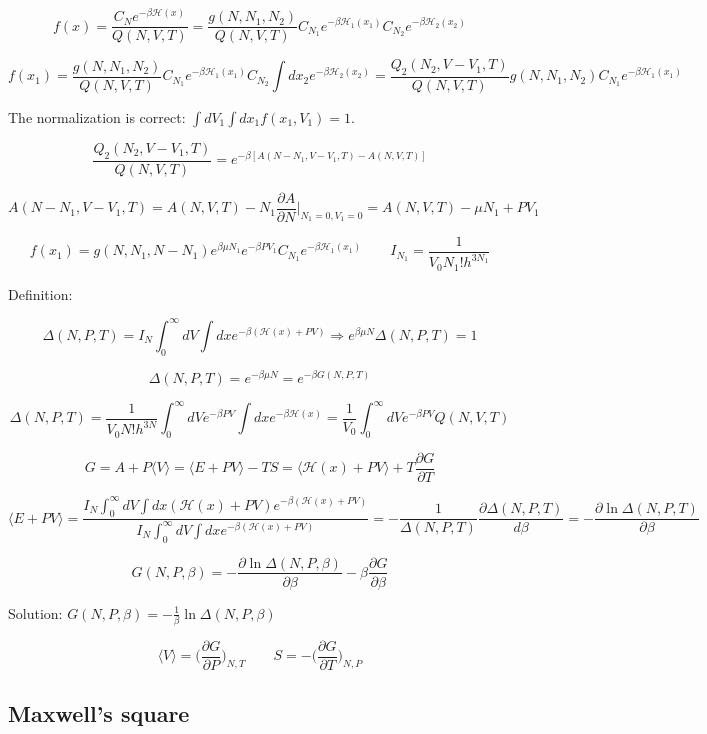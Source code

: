 	$$f(x) = \frac{C_Ne^{-\beta\mathcal{H}(x)}}{Q(N, V, T)} = \frac{g(N, N_1, N_2)}{Q(N, V, T)}C_{N_1}e^{-\beta\mathcal{H}_1(x_1)}C_{N_2}e^{-\beta\mathcal{H}_2(x_2)}$$

	$$f(x_1) = \frac{g(N, N_1, N_2)}{Q(N, V, T)}C_{N_1}e^{-\beta\mathcal{H}_1(x_1)}C_{N_2}\int dx_2 e^{-\beta\mathcal{H}_2(x_2)} = \frac{Q_2(N_2, V-V_1, T)}{Q(N, V, T)}g(N, N_1, N_2)C_{N_1}e^{-\beta\mathcal{H}_1(x_1)}$$

	The normalization is correct: $\int dV_1\int dx_1f(x_1, V_1) = 1$.

	$$\frac{Q_2(N_2, V-V_1, T)}{Q(N, V, T)} = e^{-\beta[A(N-N_1, V-V_1, T) - A(N, V, T)]}$$

	$$A(N-N_1, V-V_1, T) = A(N, V, T)-N_1\frac{\partial A}{\partial N}|_{N_1 = 0, V_1 = 0} = A(N, V, T)-\mu N_1 + PV_1$$

	$$f(x_1) = g(N, N_1, N-N_1) e^{\beta\mu N_1}e^{-\beta P V_1}C_{N_1}e^{-\beta\mathcal{H}_1(x_1)}\qquad I_{N_1} = \frac{1}{V_0N_1!h^{3N_1}}$$

	Definition:

	$$\Delta(N, P, T) = I_N\int_0^{\infty}dV\int dxe^{-\beta(\mathcal{H}(x) + PV)}\Rightarrow e^{\beta\mu N}\Delta(N, P, T) = 1$$

	$$\Delta(N, P, T) = e^{-\beta\mu N} = e^{-\beta G(N, P, T)}$$

	$$\Delta(N, P, T) = \frac{1}{V_0N!h^{3N}}\int_0^{\infty}dVe^{-\beta PV}\int dxe^{-\beta\mathcal{H}(x)} = \frac{1}{V_0}\int_0^{\infty}dVe^{-\beta PV}Q(N, V, T)$$

	$$G = A + P\langle V \rangle = \langle E + PV\rangle - TS = \langle\mathcal{H}(x) + PV\rangle + T\frac{\partial G}{\partial T}$$

	$$\langle E + PV\rangle = \frac{I_N\int_0^{\infty} dV\int dx(\mathcal{H}(x) + PV)e^{-\beta(\mathcal{H}(x)+PV)}}{I_N\int_0^{\infty}dV\int dxe^{-\beta(\mathcal{H}(x) + PV)}} = -\frac{1}{\Delta(N, P, T)}\frac{\partial \Delta(N, P, T)}{d\beta} = -\frac{\partial\ln\Delta(N, P, T)}{\partial \beta}$$

	$$G(N, P, \beta) = -\frac{\partial\ln\Delta(N, P, \beta)}{\partial\beta}-\beta\frac{\partial G}{\partial \beta}$$

	Solution: $G(N, P, \beta) = -\frac{1}{\beta}\ln\Delta(N, P, \beta)$

	$$\langle V\rangle = \biggl(\frac{\partial G}{\partial P}\biggr)_{N, T}\qquad S = -\biggl(\frac{\partial G}{\partial T}\biggr)_{N, P}$$

	\subsection{Maxwell's square}

